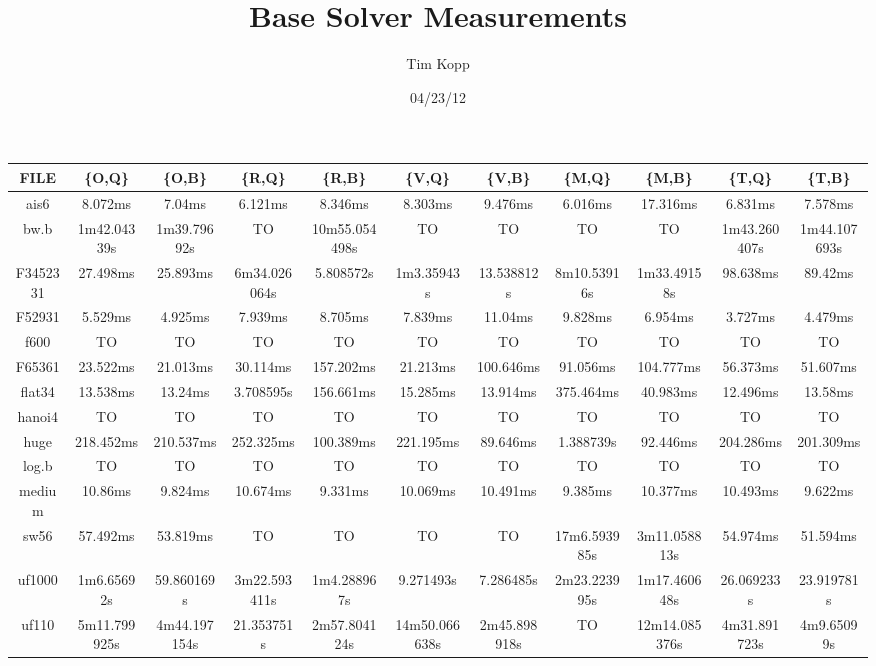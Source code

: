 \documentclass{article}
\title{Base Solver Measurements}
\author{Tim Kopp}
\date{04/23/12}
\begin{document}
\maketitle

\begin{table}[ht!]
\centering
\begin{tabular}{|c||c|c|c|c|c|c|c|c|c|c|}\hline
FILE & \{O,Q\} & \{O,B\} & \{R,Q\} & \{R,B\} & \{V,Q\} & \{V,B\} & \{M,Q\} & \{M,B\} & \{T,Q\} & \{T,B\} \\\hline\hline
ais6 & 8.072ms & 7.04ms & 6.121ms & 8.346ms & 8.303ms & 9.476ms & 6.016ms & 17.316ms & 6.831ms & 7.578ms \\\hline
bw.b  & 1m42.04339s & 1m39.79692s &TO & 10m55.054498s &TO & TO & TO & TO  & 1m43.260407s & 1m44.107693s \\\hline
F3452331  & 27.498ms & 25.893ms & 6m34.026064s & 5.808572s & 1m3.35943s & 13.538812s & 8m10.53916s & 1m33.49158s & 98.638ms & 89.42ms \\\hline
F52931  & 5.529ms & 4.925ms & 7.939ms & 8.705ms & 7.839ms & 11.04ms & 9.828ms & 6.954ms & 3.727ms & 4.479ms \\\hline
f600  &TO & TO & TO & TO & TO & TO & TO & TO & TO & TO \\\hline
F65361  & 23.522ms & 21.013ms & 30.114ms & 157.202ms & 21.213ms & 100.646ms & 91.056ms & 104.777ms & 56.373ms & 51.607ms \\\hline
flat34  & 13.538ms & 13.24ms & 3.708595s & 156.661ms & 15.285ms & 13.914ms & 375.464ms & 40.983ms & 12.496ms & 13.58ms \\\hline
hanoi4 & TO & TO & TO & TO & TO & TO & TO & TO & TO & TO \\\hline
huge  & 218.452ms & 210.537ms & 252.325ms & 100.389ms & 221.195ms & 89.646ms & 1.388739s & 92.446ms & 204.286ms & 201.309ms \\\hline
log.b  & TO & TO & TO & TO & TO & TO & TO & TO & TO & TO \\\hline
medium  & 10.86ms & 9.824ms & 10.674ms & 9.331ms & 10.069ms & 10.491ms & 9.385ms & 10.377ms & 10.493ms & 9.622ms \\\hline
sw56  & 57.492ms & 53.819ms & TO & TO & TO & TO & 17m6.593985s & 3m11.058813s & 54.974ms & 51.594ms \\\hline
uf1000  & 1m6.65692s & 59.860169s & 3m22.593411s & 1m4.288967s & 9.271493s & 7.286485s & 2m23.223995s & 1m17.460648s & 26.069233s & 23.919781s \\\hline
uf110  & 5m11.799925s & 4m44.197154s & 21.353751s & 2m57.804124s & 14m50.066638s
& 2m45.898918s &TO & 12m14.085376s & 4m31.891723s & 4m9.65099s \\\hline

\end{tabular}
\end{table}
\end{document}
